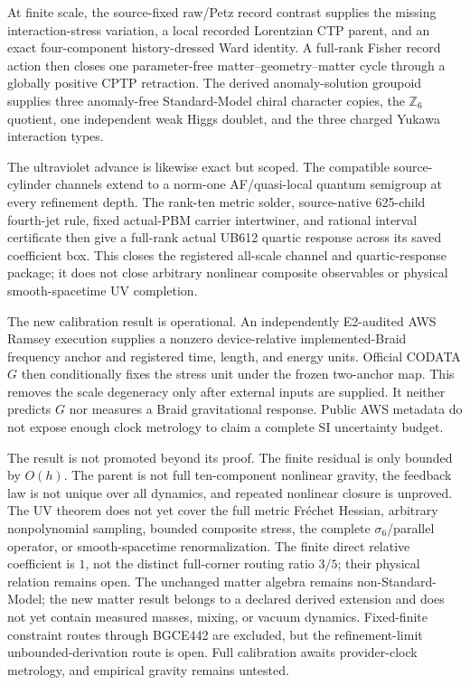 \documentclass[11pt]{article}
\theoremstyle{definition}
\theoremstyle{remark}
\begin{document}
At finite scale, the source-fixed raw/Petz record contrast supplies the missing interaction-stress variation, a local recorded Lorentzian CTP parent, and an exact four-component history-dressed Ward identity. A full-rank Fisher record action then closes one parameter-free matter--geometry--matter cycle through a globally positive CPTP retraction. The derived anomaly-solution groupoid supplies three anomaly-free Standard-Model chiral character copies, the $\mathbb Z_6$ quotient, one independent weak Higgs doublet, and the three charged Yukawa interaction types.

The ultraviolet advance is likewise exact but scoped. The compatible source-cylinder channels extend to a norm-one AF/quasi-local quantum semigroup at every refinement depth. The rank-ten metric solder, source-native 625-child fourth-jet rule, fixed actual-PBM carrier intertwiner, and rational interval certificate then give a full-rank actual UB612 quartic response across its saved coefficient box. This closes the registered all-scale channel and quartic-response package; it does not close arbitrary nonlinear composite observables or physical smooth-spacetime UV completion.

The new calibration result is operational. An independently E2-audited AWS Ramsey execution supplies a nonzero device-relative implemented-Braid frequency anchor and registered time, length, and energy units. Official CODATA $G$ then conditionally fixes the stress unit under the frozen two-anchor map. This removes the scale degeneracy only after external inputs are supplied. It neither predicts $G$ nor measures a Braid gravitational response. Public AWS metadata do not expose enough clock metrology to claim a complete SI uncertainty budget.

The result is not promoted beyond its proof. The finite residual is only bounded by $O(h)$. The parent is not full ten-component nonlinear gravity, the feedback law is not unique over all dynamics, and repeated nonlinear closure is unproved. The UV theorem does not yet cover the full metric Fr\'echet Hessian, arbitrary nonpolynomial sampling, bounded composite stress, the complete $\sigma_6$/parallel operator, or smooth-spacetime renormalization. The finite direct relative coefficient is $1$, not the distinct full-corner routing ratio $3/5$; their physical relation remains open. The unchanged matter algebra remains non-Standard-Model; the new matter result belongs to a declared derived extension and does not yet contain measured masses, mixing, or vacuum dynamics. Fixed-finite constraint routes through BGCE442 are excluded, but the refinement-limit unbounded-derivation route is open. Full calibration awaits provider-clock metrology, and empirical gravity remains untested.
\end{document}
